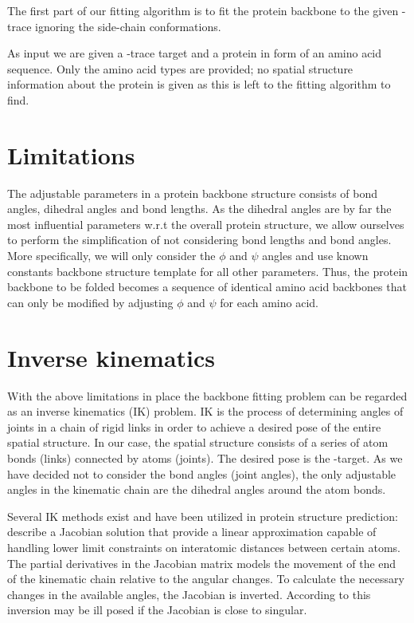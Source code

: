 The first part of our fitting algorithm is to fit the protein backbone to the given \Ca-trace ignoring the side-chain conformations.

As input we are given a \Ca-trace target and a protein in form of an amino acid sequence.
Only the amino acid types are provided; no spatial structure information about the protein is given as this is left to the fitting algorithm to find.


\section{Limitations}
The adjustable parameters in a protein backbone structure consists of bond angles, dihedral angles and bond lengths.
As the dihedral angles are by far the most influential parameters w.r.t the overall protein structure, we allow ourselves to perform the simplification of not considering bond lengths and bond angles.
More specifically, we will only consider the $\phi$ and $\psi$ angles and use known constants backbone structure template for all other parameters.
Thus, the protein backbone to be folded becomes a sequence of identical amino acid backbones that can only be modified by adjusting $\phi$ and $\psi$ for each amino acid.


\section{Inverse kinematics}
With the above limitations in place the backbone fitting problem can be regarded as an inverse kinematics (IK) problem.
IK is the process of determining angles of joints in a chain of rigid links in order to achieve a desired pose of the entire spatial structure.
In our case, the spatial structure consists of a series of atom bonds (links) connected by atoms (joints).
The desired pose is the \Ca-target.
As we have decided not to consider the bond angles (joint angles), the only adjustable angles in the kinematic chain are the dihedral angles around the atom bonds.

Several IK methods exist and have been utilized in protein structure prediction:
\cite{shenkin1987} describe a Jacobian solution that provide a linear approximation capable of handling lower limit constraints on interatomic distances between certain atoms.
The partial derivatives in the Jacobian matrix models the movement of the end of the kinematic chain relative to the angular changes.
To calculate the necessary changes in the available angles, the Jacobian is inverted.
According to \cite{canutescu2003} this inversion may be ill posed if the Jacobian is close to singular.



